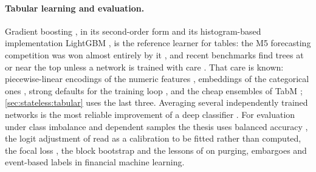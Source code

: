 \paragraph{Tabular learning and evaluation.}  Gradient boosting \cite{friedman2001gbm}, in
its second-order form \cite{chen2016xgboost} and its histogram-based implementation LightGBM
\cite{ke2017lightgbm}, is the reference learner for tables: the M5 forecasting competition
was won almost entirely by it \cite{makridakis2022m5}, and recent benchmarks find trees at or
near the top unless a network is trained with care \cite{jiang2026omnitabbench}.  That care
is known: piecewise-linear encodings of the numeric features \cite{gorishniy2022embeddings},
embeddings of the categorical ones \cite{guo2016entity}, strong defaults for the training
loop \cite{holzmuller2024betterbydefault}, and the cheap ensembles of TabM
\cite{gorishniy2025tabm}; \cref{sec:stateless:tabular} uses the last three.  Averaging several independently trained networks
is the most reliable improvement of a deep classifier \cite{lakshminarayanan2017ensembles}.
For evaluation under class imbalance and dependent samples the thesis uses balanced accuracy
\cite{brodersen2010balanced}, the logit adjustment of \textcite{menon2021logitadjustment}
read as a calibration to be fitted rather than computed, the focal loss \cite{lin2017focal},
the block bootstrap \cite{kunsch1989jackknife} and the lessons of
\textcite{lopezdeprado2018advances} on purging, embargoes and event-based labels in
financial machine learning.
